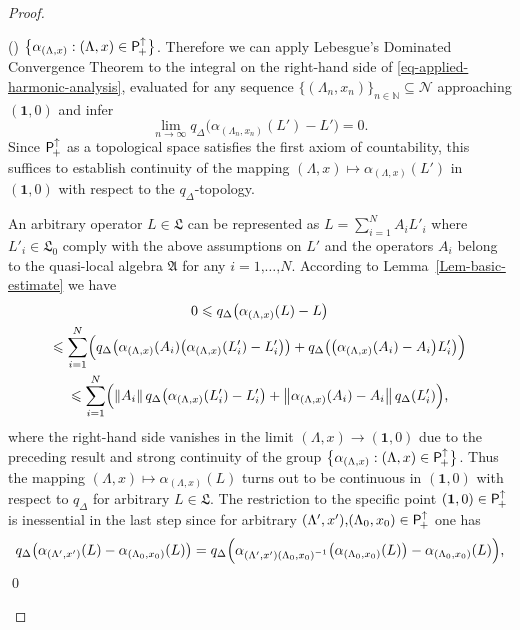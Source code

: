 \documentclass[11pt,twoside,openright]{report}
\theoremstyle{definition}
\theoremstyle{plain}
\theoremstyle{remark}
\theoremstyle{assumption}
\newcommand{\bset}[1]{\bigl\{ #1 \bigr\}}
\newcommand{\norm}[1]{\lVert #1 \rVert}
\newcommand{\bnorm}[1]{\bigl\lVert #1 \bigr\rVert}
\newcommand{\qD}{q_\Delta}
\newcommand{\qDx}[1]{q_\Delta ( #1 )}
\newcommand{\bqDx}[1]{q_\Delta \bigl( #1 \bigr)}
\newcommand{\BqDx}[1]{q_\Delta \Bigl( #1 \Bigr)}
\newcommand{\Nbb}{\mathbb{N}}
\newcommand{\Afrak}{\mathfrak{A}}
\newcommand{\Lfrak}{\mathfrak{L}}
\newcommand{\Nscr}{\mathscr{N}}
\newcommand{\unit}{\mathbf{1}}
\newcommand{\Poin}{\mathsf{P}_{\negthinspace +}^\uparrow}
\newcommand{\aLax}{\alpha_{( \Lambda , x )}}
\newcommand{\aLaxprime}{\alpha_{( \Lambda' , x' )}}
\newcounter{proofitem}
\newenvironment{prooflist}{\begin{list}{(\roman{proofitem})}%
  {\usecounter{proofitem} \setlength{\topsep}{0ex}%
   \setlength{\parsep}{0.2ex} \setlength{\itemsep}{0.4ex}%
   \setlength{\leftmargin}{0em} \setlength{\itemindent}{0.5em}%
   \setlength{\listparindent}{1em}}}{\qed \end{list}}
\begin{document}
\begin{proof}
\begin{prooflist}
    $\bset{\aLax : ( \Lambda , x ) \in \Poin}$. Therefore we can apply
    Lebesgue's Dominated Convergence Theorem to the integral on the
    right-hand side of \eqref{eq-applied-harmonic-analysis}, evaluated
    for any sequence $\bset{( \Lambda_n , x_n )}_{n \in \Nbb}
    \subseteq \Nscr$ approaching $( \unit , 0 )$ and infer
    \begin{equation*}
      \lim_{n \rightarrow \infty} \bqDx{\alpha_{( \Lambda_n , x_n )} (
      L' ) - L'} = 0 \text{.}
    \end{equation*}
    Since $\Poin$ as a topological space satisfies the first axiom of
    countability, this suffices to establish continuity of the mapping
    $( \Lambda ,x ) \mapsto \aLax ( L' )$ in $( \unit , 0 )$ with
    respect to the $\qD$-topology.

    An arbitrary operator $L \in \Lfrak$ can be represented as $L =
    \sum_{i = 1}^N  A_i L'_i$ where $L'_i \in \Lfrak_0$ comply with
    the above assumptions on $L'$ and the operators $A_i$ belong to
    the quasi-local algebra $\Afrak$ for any $i=1 \text{,} \dots
    \text{,} N$. According to Lemma~\ref{Lem-basic-estimate} we have
    \begin{multline*}
      0 \leqslant \bqDx{\aLax ( L ) - L} \\
      \leqslant \sum_{i = 1}^N \Bigl( \bqDx{\aLax ( A_i ) \bigl( \aLax
      ( L'_i ) - L'_i \bigr)} + \bqDx{\bigl( \aLax ( A_i ) - A_i
      \bigr) L'_i} \Bigr) \\
      \leqslant \sum_{i = 1}^N \Bigl( \norm{A_i} \, \bqDx{\aLax ( L'_i
      ) - L'_i} + \bnorm{\aLax  ( A_i ) - A_i} \, \qDx{L'_i} \Bigr)
      \text{,}
    \end{multline*}
    where the right-hand side vanishes in the limit $( \Lambda , x )
    \rightarrow ( \unit , 0 )$ due to the preceding result and strong
    continuity of the group $\bset{\aLax : ( \Lambda , x ) \in
    \Poin}$. Thus the mapping $( \Lambda , x ) \mapsto \aLax ( L )$ 
    turns out to be continuous in $( \unit , 0 )$ with respect to
    $\qD$ for arbitrary $L \in \Lfrak$. The restriction to the
    specific point $( \unit , 0 ) \in \Poin$ is inessential in the
    last step since for arbitrary $( \Lambda' , x' ) \text{,} (
    \Lambda_0 , x_0 ) \in \Poin$ one has 
    \begin{equation*}
      \bqDx{\aLaxprime ( L ) - \alpha_{( \Lambda_0 , x_0 )} ( L )} =
      \BqDx{\alpha_{( \Lambda' , x' ) {( \Lambda_0 , x_0 )}^{-1}}
      \bigl( \alpha_{( \Lambda_0 , x_0 )} ( L ) \bigr) - \alpha_{(
      \Lambda_0 , x_0 )} ( L )} \text{,}

\end{equation*}
\end{prooflist}
\end{proof}
\end{document}
